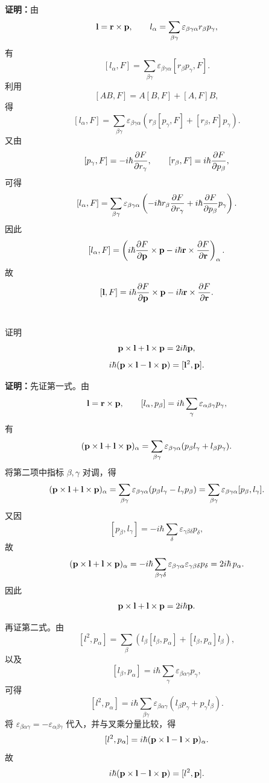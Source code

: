 \documentclass[12pt,a4paper]{article}
\begin{document}
\vspace{0.5cm}

\noindent\textbf{证明：}由
\[
\vb{l}=\vb{r}\times \vb{p},
\qquad
l_{\alpha}=\sum_{\beta\gamma}\varepsilon_{\beta\gamma\alpha}r_{\beta}p_{\gamma},
\]
有
\[
[l_{\alpha},F]
=
\sum_{\beta\gamma}\varepsilon_{\beta\gamma\alpha}[r_{\beta}p_{\gamma},F].
\]
利用
\[
[AB,F]=A[B,F]+[A,F]B,
\]
得
\[
[l_{\alpha},F]
=
\sum_{\beta\gamma}\varepsilon_{\beta\gamma\alpha}
\left(
r_{\beta}[p_{\gamma},F]+[r_{\beta},F]p_{\gamma}
\right).
\]
又由
\[
[p_{\gamma},F]=-i\hbar \pdv{F}{r_{\gamma}},
\qquad
[r_{\beta},F]=i\hbar \pdv{F}{p_{\beta}},
\]
可得
\[
[l_{\alpha},F]
=
\sum_{\beta\gamma}\varepsilon_{\beta\gamma\alpha}
\left(
-i\hbar r_{\beta}\pdv{F}{r_{\gamma}}
+i\hbar \pdv{F}{p_{\beta}}p_{\gamma}
\right).
\]
因此
\[
[l_{\alpha},F]
=
\left(
i\hbar \pdv{F}{\vb{p}}\times \vb{p}
-i\hbar \vb{r}\times \pdv{F}{\vb{r}}
\right)_{\alpha}.
\]
故
\[
[\vb{l},F]
=
i\hbar \pdv{F}{\vb{p}}\times \vb{p}
-
i\hbar \vb{r}\times \pdv{F}{\vb{r}}.
\]

\section{}
证明
\[
\vb{p}\times \vb{l}+\vb{l}\times \vb{p}=2i\hbar \vb{p},
\]
\[
i\hbar (\vb{p}\times \vb{l}-\vb{l}\times \vb{p})=[\vb{l}^{2},\vb{p}].
\]

\vspace{0.5cm}

\noindent\textbf{证明：}先证第一式。由
\[
\vb{l}=\vb{r}\times \vb{p},
\qquad
[l_{\alpha},p_{\beta}]=i\hbar \sum_{\gamma}\varepsilon_{\alpha\beta\gamma}p_{\gamma},
\]
有
\[
(\vb{p}\times \vb{l}+\vb{l}\times \vb{p})_{\alpha}
=
\sum_{\beta\gamma}\varepsilon_{\beta\gamma\alpha}(p_{\beta}l_{\gamma}+l_{\beta}p_{\gamma}).
\]
将第二项中指标 \(\beta,\gamma\) 对调，得
\[
(\vb{p}\times \vb{l}+\vb{l}\times \vb{p})_{\alpha}
=
\sum_{\beta\gamma}\varepsilon_{\beta\gamma\alpha}(p_{\beta}l_{\gamma}-l_{\gamma}p_{\beta})
=
\sum_{\beta\gamma}\varepsilon_{\beta\gamma\alpha}[p_{\beta},l_{\gamma}].
\]
又因
\[
[p_{\beta},l_{\gamma}]=-i\hbar \sum_{\delta}\varepsilon_{\gamma\beta\delta}p_{\delta},
\]
故
\[
(\vb{p}\times \vb{l}+\vb{l}\times \vb{p})_{\alpha}
=
-i\hbar \sum_{\beta\gamma\delta}
\varepsilon_{\beta\gamma\alpha}\varepsilon_{\gamma\beta\delta}p_{\delta}
=
2i\hbar\, p_{\alpha}.
\]
因此
\[
\vb{p}\times \vb{l}+\vb{l}\times \vb{p}=2i\hbar \vb{p}.
\]

再证第二式。由
\[
[l^{2},p_{\alpha}]
=
\sum_{\beta}(l_{\beta}[l_{\beta},p_{\alpha}]+[l_{\beta},p_{\alpha}]l_{\beta}),
\]
以及
\[
[l_{\beta},p_{\alpha}]
=
i\hbar \sum_{\gamma}\varepsilon_{\beta\alpha\gamma}p_{\gamma},
\]
可得
\[
[l^{2},p_{\alpha}]
=
i\hbar \sum_{\beta\gamma}\varepsilon_{\beta\alpha\gamma}(l_{\beta}p_{\gamma}+p_{\gamma}l_{\beta}).
\]
将 \(\varepsilon_{\beta\alpha\gamma}=-\varepsilon_{\alpha\beta\gamma}\) 代入，并与叉乘分量比较，得
\[
[l^{2},p_{\alpha}]
=
i\hbar (\vb{p}\times \vb{l}-\vb{l}\times \vb{p})_{\alpha}.
\]
故
\[
i\hbar (\vb{p}\times \vb{l}-\vb{l}\times \vb{p})=[l^{2},\vb{p}].
\]
\end{document}
